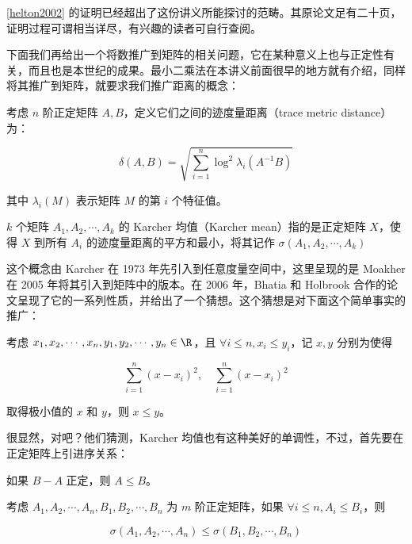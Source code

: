 \ref{helton2002} 的证明已经超出了这份讲义所能探讨的范畴。其原论文足有二十页，证明过程可谓相当详尽，有兴趣的读者可自行查阅。

下面我们再给出一个将数推广到矩阵的相关问题，它在某种意义上也与正定性有关，而且也是本世纪的成果。最小二乘法在本讲义前面很早的地方就有介绍，同样将其推广到矩阵，就要求我们推广距离的概念：

\begin{definition}
    考虑 $n$ 阶正定矩阵 $A, B$，定义它们之间的迹度量距离（trace metric distance）为：

    \[
    \delta(A, B) = \sqrt{\sum_{i = 1}^n \log^2\lambda_i(A^{-1}B)}
    \]

    其中 $\lambda_i(M)$ 表示矩阵 $M$ 的第 $i$ 个特征值。
\end{definition}

\begin{definition}
    $k$ 个矩阵 $A_1, A_2, \cdots, A_k$ 的 Karcher 均值（Karcher mean）指的是正定矩阵 $X$，使得 $X$ 到所有 $A_i$ 的迹度量距离的平方和最小，将其记作 $\sigma(A_1, A_2, \cdots, A_k)$
\end{definition}

这个概念由 Karcher 在 1973 年先引入到任意度量空间中，这里呈现的是 Moakher 在 2005 年将其引入到矩阵中的版本。在 2006 年，Bhatia 和 Holbrook 合作的论文呈现了它的一系列性质，并给出了一个猜想。这个猜想是对下面这个简单事实的推广：

\begin{lemma}
考虑 $x_1, x_2, \cdots, x_n, y_1, y_2, \cdots, y_n \in \R$，且 $\forall i \leqslant n, x_i \leqslant y_i$，记 $x, y$ 分别为使得

\[
\sum_{i = 1}^n (x - x_i)^2, \quad \sum_{i = 1}^n (x - x_i)^2
\]

取得极小值的 $x$ 和 $y$，则 $x \leqslant y$。
\end{lemma}

很显然，对吧？他们猜测，Karcher 均值也有这种美好的单调性，不过，首先要在正定矩阵上引进序关系：

\begin{definition}
    如果 $B - A$ 正定，则 $A \leqslant B$。
\end{definition}

\begin{theorem}
    考虑 $A_1, A_2, \cdots, A_n, B_1, B_2, \cdots, B_n$ 为 $m$ 阶正定矩阵，如果 $\forall i \leqslant n, A_i \leqslant B_i$，则

    \[
    \sigma(A_1, A_2, \cdots, A_n) \leqslant \sigma(B_1, B_2, \cdots, B_n)
    \]
\end{theorem}


